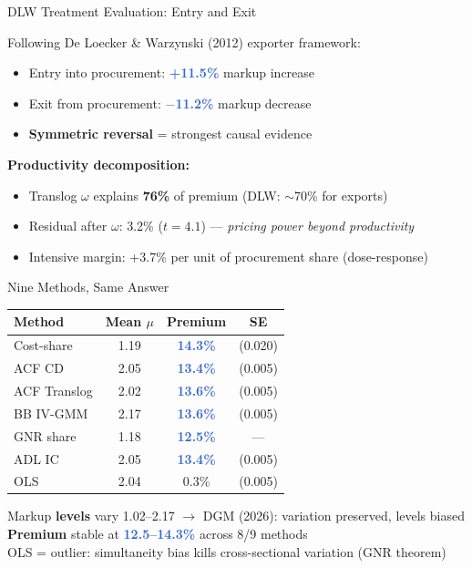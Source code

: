 \documentclass[aspectratio=169,11pt]{beamer}
\newcommand{\accenttext}[1]{\textcolor{accent}{\textbf{#1}}}
\newcommand{\highlighttext}[1]{\textcolor{highlight}{\textbf{#1}}}
\begin{document}
\begin{frame}{DLW Treatment Evaluation: Entry and Exit}

Following De Loecker \& Warzynski (2012) exporter framework:

\medskip
\begin{itemize}
    \item Entry into procurement: \highlighttext{+11.5\%} markup increase
    \item Exit from procurement: \highlighttext{$-$11.2\%} markup decrease
    \item \accenttext{Symmetric reversal} = strongest causal evidence
\end{itemize}

\pause
\medskip
\textbf{Productivity decomposition:}
\begin{itemize}
    \item Translog $\omega$ explains \accenttext{76\%} of premium (DLW: $\sim$70\% for exports)
    \item Residual after $\omega$: 3.2\% ($t = 4.1$) --- \emph{pricing power beyond productivity}
    \item Intensive margin: +3.7\% per unit of procurement share (dose-response)
\end{itemize}

\end{frame}

\begin{frame}{Nine Methods, Same Answer}

\small
\begin{center}
\begin{tabular}{lccc}
\toprule
Method & Mean $\mu$ & Premium & SE \\
\midrule
Cost-share & 1.19 & \highlighttext{14.3\%} & (0.020) \\
ACF CD & 2.05 & \highlighttext{13.4\%} & (0.005) \\
ACF Translog & 2.02 & \highlighttext{13.6\%} & (0.005) \\
BB IV-GMM & 2.17 & \highlighttext{13.6\%} & (0.005) \\
GNR share & 1.18 & \highlighttext{12.5\%} & --- \\
ADL IC & 2.05 & \highlighttext{13.4\%} & (0.005) \\
\textcolor{muted}{OLS} & \textcolor{muted}{2.04} & \textcolor{muted}{0.3\%} & \textcolor{muted}{(0.005)} \\
\bottomrule
\end{tabular}
\end{center}

\normalsize
\pause
\medskip
Markup \textbf{levels} vary 1.02--2.17 \quad $\rightarrow$ \quad DGM (2026): variation preserved, levels biased \\
\textbf{Premium} stable at \highlighttext{12.5--14.3\%} across 8/9 methods \\
OLS = outlier: simultaneity bias kills cross-sectional variation (GNR theorem)

\end{frame}
\end{document}
